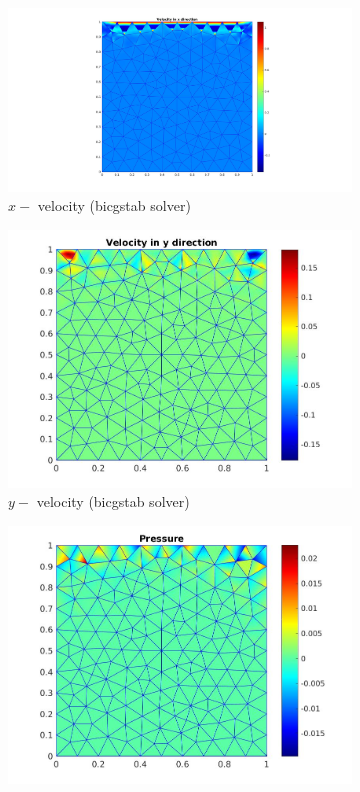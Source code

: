 \documentclass[a4paper]{book}
\begin{document}
\begin{figure}[H]
\begin{subfigure}{0.5\textwidth}	
  \includegraphics[width=\linewidth]{lid_bicgstab_vx.jpg}
  \caption{$x-$ velocity (bicgstab solver)}
  \label{x_vel_stoke_bicgstab_lid}
\end{subfigure}
\begin{subfigure}{0.5\textwidth}	
  \includegraphics[width=\linewidth]{lid_bicgstab_vy.jpg}
  \caption{$y-$ velocity (bicgstab solver)}
  \label{y_vel_stoke_bicgstab_lid}
\end{subfigure}
\begin{subfigure}{\textwidth}	
  \includegraphics[width=\linewidth]{lid_bicgstab_pressure.jpg}

\end{subfigure}
\end{figure}
\end{document}
